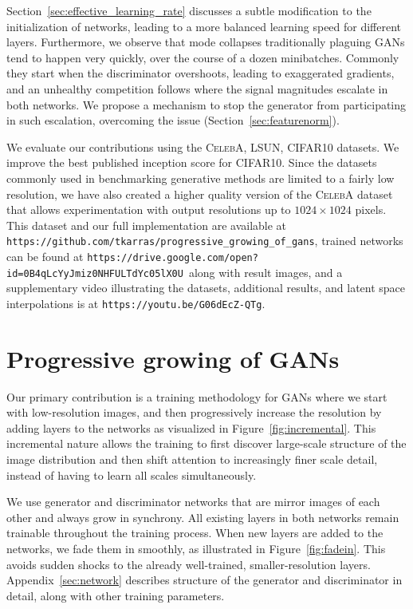 \documentclass{article}
\newcommand{\videolink}{\texttt{\small{https://youtu.be/G06dEcZ-QTg}}}
\newcommand{\networklink}{\texttt{\small{https://drive.google.com/open?id=0B4qLcYyJmiz0NHFULTdYc05lX0U}}}
\begin{document}
Section~\ref{sec:effective_learning_rate} discusses a subtle modification to the initialization of networks, leading to a more balanced learning speed for different layers. Furthermore, we observe that mode collapses traditionally plaguing GANs tend to happen very quickly, over the course of a dozen minibatches. Commonly they start when the discriminator overshoots, leading to exaggerated gradients, and an unhealthy competition follows where the signal magnitudes escalate in both networks. We propose a mechanism to stop the generator from participating in such escalation, overcoming the issue (Section~\ref{sec:featurenorm}).

We evaluate our contributions using the \textsc{CelebA}, \textsc{LSUN}, \textsc{CIFAR10} datasets. We improve the best published inception score for \textsc{CIFAR10}. %
Since the datasets commonly used in benchmarking generative methods are limited to a fairly low resolution, we have also created a higher quality version of the \textsc{CelebA} dataset that allows experimentation with output resolutions up to $1024\times1024$ pixels. This dataset and our full implementation are available at {\small\verb|https://github.com/tkarras/progressive_growing_of_gans|}, trained networks can be found at \networklink~along with result images, and a supplementary video illustrating the datasets, additional results, and latent space interpolations is at \videolink.

\section{Progressive growing of GANs}
\label{sec:progressive}

Our primary contribution is a training methodology for GANs where we start with low-resolution images, and then progressively increase the resolution by adding layers to the networks as visualized in Figure~\ref{fig:incremental}. This incremental nature allows the training to first discover large-scale structure of the image distribution and then shift attention to increasingly finer scale detail, instead of having to learn all scales simultaneously.

We use generator and discriminator networks that are mirror images of each other and always grow in synchrony. All existing layers in both networks remain trainable throughout the training process. When new layers are added to the networks, we fade them in smoothly, as illustrated in Figure~\ref{fig:fadein}. This avoids sudden shocks to the already well-trained, smaller-resolution layers. Appendix~\ref{sec:network} describes structure of the generator and discriminator in detail, along with other training parameters. 
\end{document}
